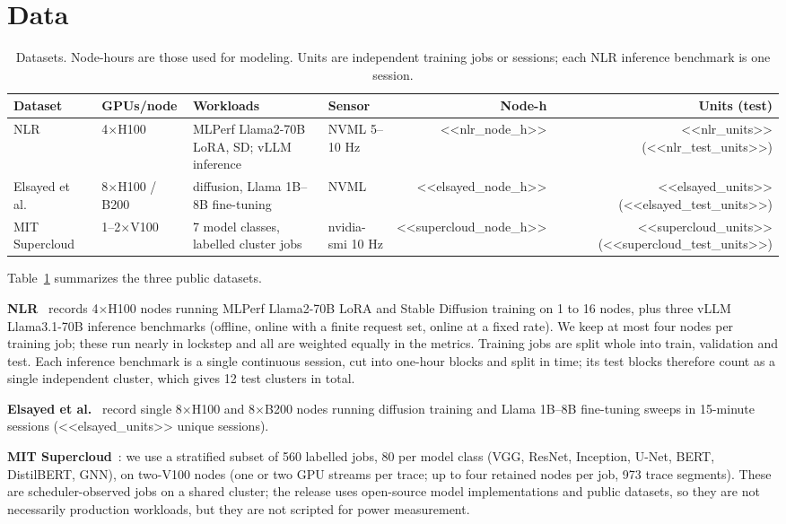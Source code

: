 \documentclass[11pt]{article}
\begin{document}
\section{Data}
\label{sec:data}

\begin{table}[t]
\centering
\caption{Datasets. Node-hours are those used for modeling. Units are independent training jobs or sessions; each NLR inference benchmark is one session.}
\label{tab:data}
\footnotesize
\begin{tabular}{@{}l l p{4.2cm} l r r@{}}
\toprule
Dataset & GPUs/node & Workloads & Sensor & Node-h & Units (test) \\
\midrule
NLR~\cite{nlr} & 4$\times$H100 & MLPerf Llama2-70B LoRA, SD; vLLM inference & NVML 5--10 Hz & <<nlr_node_h>> & <<nlr_units>> (<<nlr_test_units>>) \\
Elsayed et al.~\cite{elsayed} & 8$\times$H100 / B200 & diffusion, Llama 1B--8B fine-tuning & NVML & <<elsayed_node_h>> & <<elsayed_units>> (<<elsayed_test_units>>) \\
MIT Supercloud~\cite{supercloud} & 1--2$\times$V100 & 7 model classes, labelled cluster jobs & nvidia-smi 10 Hz & <<supercloud_node_h>> & <<supercloud_units>> (<<supercloud_test_units>>) \\
\bottomrule
\end{tabular}
\end{table}

Table~\ref{tab:data} summarizes the three public datasets.

\textbf{NLR}~\cite{nlr} records 4$\times$H100 nodes running MLPerf Llama2-70B LoRA and Stable Diffusion
training on 1 to 16 nodes, plus three vLLM Llama3.1-70B inference benchmarks (offline, online with a
finite request set, online at a fixed rate). We keep at most four nodes per training job; these run
nearly in lockstep and all are weighted equally in the metrics. Training jobs are split whole into train,
validation and test. Each inference benchmark is a single continuous session, cut into one-hour blocks and
split in time; its test blocks therefore count as a single independent cluster, which gives 12 test
clusters in total.

\textbf{Elsayed et al.}~\cite{elsayed} record single 8$\times$H100 and 8$\times$B200 nodes running diffusion
training and Llama 1B--8B fine-tuning sweeps in 15-minute sessions (<<elsayed_units>> unique sessions).

\textbf{MIT Supercloud}~\cite{supercloud}: we use a stratified subset of 560 labelled jobs, 80 per model
class (VGG, ResNet, Inception, U-Net, BERT, DistilBERT, GNN), on two-V100 nodes (one or two GPU streams
per trace; up to four retained nodes per job, 973 trace segments). These are scheduler-observed jobs on a shared
cluster; the release uses open-source model implementations and public datasets, so they are not
necessarily production workloads, but they are not scripted for power measurement.
\end{document}
